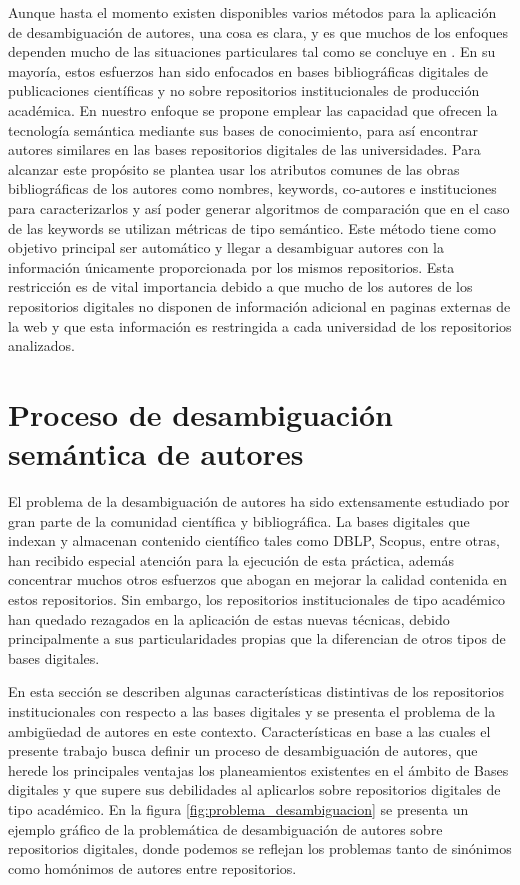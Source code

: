 \documentclass[conference]{IEEEtran}
\begin{document}
Aunque  hasta el momento existen disponibles varios métodos para la aplicación de desambiguación de autores, una cosa es clara, y es que muchos de los enfoques dependen mucho de las situaciones particulares tal como se concluye en \cite{Smalheiser:2009:AND:1951529.1951542}. En su mayoría, estos esfuerzos han sido enfocados en bases bibliográficas digitales de publicaciones científicas  y no sobre repositorios institucionales de producción académica.  En nuestro enfoque se propone emplear las capacidad que ofrecen la tecnología semántica mediante sus bases de conocimiento, para así encontrar autores similares en las bases repositorios digitales de las universidades. Para alcanzar  este propósito se plantea usar los atributos comunes de las obras bibliográficas de los autores como nombres, keywords, co-autores e instituciones para caracterizarlos   y así poder generar algoritmos de comparación que en el caso de las keywords se utilizan métricas de tipo semántico.  Este método tiene como objetivo principal ser automático y llegar a desambiguar autores con la información únicamente proporcionada por  los mismos repositorios. Esta restricción es de vital importancia debido a que mucho de los autores de los repositorios digitales no disponen de información adicional en paginas externas de la web y que esta información es restringida a cada universidad de los repositorios analizados.


\section{Proceso de desambiguación semántica de autores}
El problema de la desambiguación de autores ha sido extensamente estudiado por gran parte de la comunidad científica y bibliográfica. La bases digitales que indexan y almacenan contenido científico tales como DBLP, Scopus, entre otras, han recibido especial atención para la ejecución de esta práctica, además concentrar muchos otros esfuerzos que abogan en mejorar la calidad contenida en estos repositorios. Sin embargo, los repositorios institucionales de tipo académico  han quedado rezagados en la aplicación de estas nuevas técnicas, debido principalmente  a sus particularidades propias que la diferencian de otros tipos de bases digitales. 

En esta sección se describen algunas características distintivas de los repositorios institucionales con respecto a las bases digitales y se presenta el problema de la ambigüedad de autores en este contexto. Características en base a las cuales el presente trabajo busca definir un proceso de desambiguación de autores, que herede los principales ventajas los planeamientos existentes en el ámbito de Bases digitales y que supere sus debilidades al aplicarlos sobre repositorios digitales de  tipo académico. En la figura \ref{fig:problema_desambiguacion} se presenta un ejemplo gráfico de la problemática de desambiguación de autores sobre repositorios digitales, donde podemos se reflejan los problemas tanto de sinónimos como homónimos de autores  entre repositorios.
\end{document}
